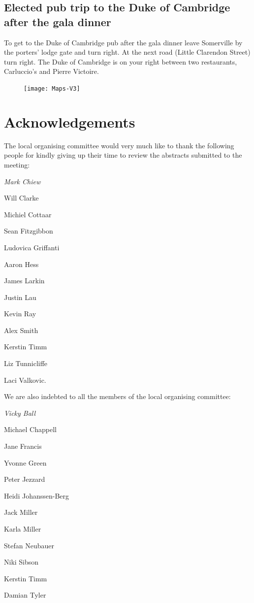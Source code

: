 \documentclass[a5paper,10pt,twoside,onecolumn,openany,helvetica,showtrims]{memoir}
\begin{document}
\subsection{Elected pub trip to the Duke of Cambridge after the gala dinner}
To get to the Duke of Cambridge pub after the gala dinner leave Somerville by the porters' lodge gate and turn right. At the next road (Little Clarendon Street) turn right. The Duke of Cambridge is on your right between two restaurants, Carluccio's and Pierre Victoire. 

\begin{figure}[H]
\centering
\texttt{[image: Maps-V3]}

\end{figure}

\section*{Acknowledgements}


The local organising committee would very much like to thank the following people for kindly giving up their time to review the abstracts submitted to the meeting:

\begin{multicols}{2}
\itshape Mark Chiew

Will Clarke

Michiel Cottaar

Sean Fitzgibbon

Ludovica Griffanti
 
Aaron Hess 
  
James Larkin

Justin Lau

Kevin Ray

Alex Smith
  
Kerstin Timm
   
Liz Tunnicliffe
    
Laci Valkovic.
\end{multicols}


We are also indebted to all the members of the local organising committee: 

\begin{multicols}{2}
\itshape Vicky Ball

Michael Chappell

Jane Francis

Yvonne Green

Peter Jezzard

Heidi Johanssen-Berg

Jack Miller

Karla Miller

Stefan Neubauer

Niki Sibson

Kerstin Timm

Damian Tyler
\end{multicols}
\end{document}

